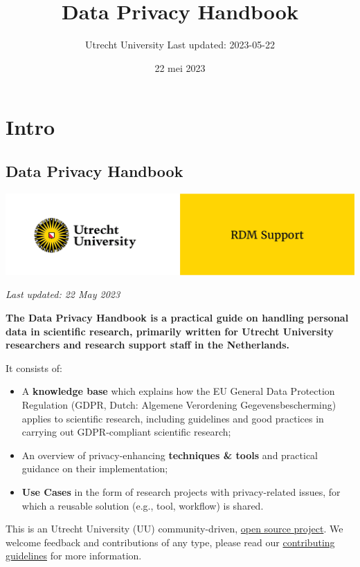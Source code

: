 \documentclass[
]{book}
\title{Data Privacy Handbook}
\author{Utrecht University \textbar{} Last updated: 2023-05-22}
\date{22 mei 2023}
\providecommand{\tightlist}{%
  \setlength{\itemsep}{0pt}\setlength{\parskip}{0pt}}
\begin{document}
\maketitle

{
\setcounter{tocdepth}{1}
\tableofcontents
}
\hypertarget{part-intro}{%
\part*{Intro}\label{part-intro}}

\hypertarget{data-privacy-handbook}{%
\chapter*{Data Privacy Handbook}\label{data-privacy-handbook}}

\includegraphics{img/cover-image-dph.png}

\emph{Last updated: 22 May 2023}

\textbf{The Data Privacy Handbook is a practical guide on handling personal data in
scientific research, primarily written for Utrecht University researchers and
research support staff in the Netherlands.}

It consists of:

\begin{itemize}
\tightlist
\item
  A \textbf{knowledge base} which explains how the EU General Data Protection
  Regulation (GDPR, Dutch: Algemene Verordening Gegevensbescherming) applies to
  scientific research, including guidelines and good practices in carrying out
  GDPR-compliant scientific research;
\item
  An overview of privacy-enhancing \textbf{techniques \& tools} and practical guidance
  on their implementation;
\item
  \textbf{Use Cases} in the form of research projects with privacy-related issues,
  for which a reusable solution (e.g., tool, workflow) is shared.
\end{itemize}

This is an Utrecht University (UU) community-driven,
\href{https://github.com/UtrechtUniversity/dataprivacyhandbook}{open source project}.
We welcome feedback and contributions of any type, please read our
\href{https://github.com/UtrechtUniversity/dataprivacyhandbook/blob/main/CONTRIBUTING.md}{contributing guidelines}
for more information.
\end{document}

